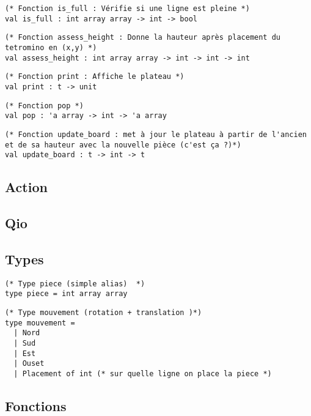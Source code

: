 \documentclass{article}
\begin{document}
\begin{lstlisting}[frame=L]
(* Fonction is_full : Vérifie si une ligne est pleine *)
val is_full : int array array -> int -> bool
\end{lstlisting}

\begin{lstlisting}[frame=L]
(* Fonction assess_height : Donne la hauteur après placement du tetromino en (x,y) *)
val assess_height : int array array -> int -> int -> int
\end{lstlisting}

\begin{lstlisting}[frame=L]
(* Fonction print : Affiche le plateau *)
val print : t -> unit
\end{lstlisting}

\begin{lstlisting}[frame=L]
(* Fonction pop *)
val pop : 'a array -> int -> 'a array
\end{lstlisting}

\begin{lstlisting}[frame=L]
(* Fonction update_board : met à jour le plateau à partir de l'ancien et de sa hauteur avec la nouvelle pièce (c'est ça ?)*)
val update_board : t -> int -> t
\end{lstlisting}

\subsection{Action}

\subsection{Qio}


\subsection{Types}


\begin{lstlisting}[frame=L]
(* Type piece (simple alias)  *)
type piece = int array array
\end{lstlisting}

\begin{lstlisting}[frame=L]
(* Type mouvement (rotation + translation )*)
type mouvement =
  | Nord
  | Sud
  | Est
  | Ouset
  | Placement of int (* sur quelle ligne on place la piece *)
\end{lstlisting}

\subsection{Fonctions}
\end{document}
